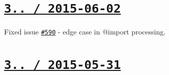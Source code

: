 \section*{\href{https://github.com/jakubpawlowicz/clean-css/compare/v3.3.0...v3.3.1}{\tt 3.. / 2015-\/06-\/02} }


\begin{DoxyItemize}
\item Fixed issue \href{https://github.com/jakubpawlowicz/clean-css/issues/590}{\tt \#590} -\/ edge case in {\ttfamily @import} processing.
\end{DoxyItemize}

\section*{\href{https://github.com/jakubpawlowicz/clean-css/compare/v3.2.11...v3.3.0}{\tt 3.. / 2015-\/05-\/31} }


